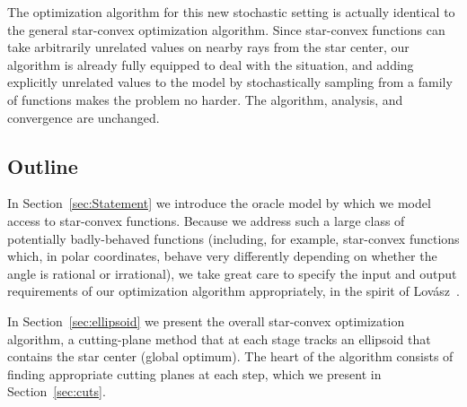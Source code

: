 \documentclass[11pt,letter]{article}
\numberwithin{nTheorems}{section}
\begin{document}
The optimization algorithm for this new stochastic setting is actually identical to the general star-convex optimization algorithm. Since star-convex functions can take arbitrarily unrelated values on nearby rays from the star center, our algorithm is already fully equipped to deal with the situation, and adding explicitly unrelated values to the model by stochastically sampling from a family of functions  makes the problem no harder. The algorithm, analysis, and convergence are unchanged.


\subsection{Outline}
In Section~\ref{sec:Statement} we introduce the oracle model by which we model access to star-convex functions. Because we address such a large class of potentially badly-behaved functions (including, for example, star-convex functions which, in polar coordinates, behave very differently depending on whether the angle is rational or irrational), we take great care to specify the input and output requirements of our optimization algorithm appropriately, in the spirit of Lov\'{a}sz~\cite{Lovasz:1987}.

In Section~\ref{sec:ellipsoid} we present the overall star-convex optimization algorithm, a cutting-plane method that at each stage tracks an ellipsoid that contains the star center (global optimum). The heart of the algorithm consists of finding appropriate cutting planes at each step, which we present in Section~\ref{sec:cuts}.
\end{document}
